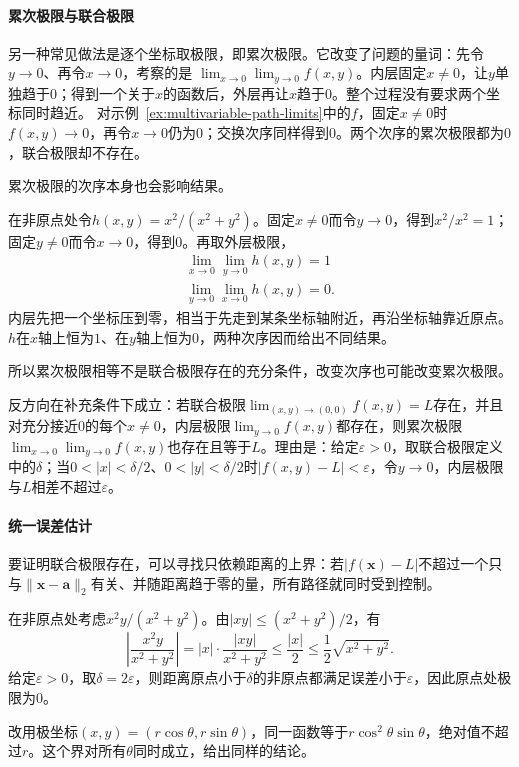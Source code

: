 \paragraph{累次极限与联合极限}
另一种常见做法是逐个坐标取极限，即累次极限。它改变了问题的量词：先令$y\to0$、再令$x\to0$，考察的是
$\lim_{x\to0}\lim_{y\to0}f(x,y)$。内层固定$x\neq0$，让$y$单独趋于$0$；得到一个关于$x$的函数后，外层再让$x$趋于$0$。整个过程没有要求两个坐标同时趋近。
对示例~\ref{ex:multivariable-path-limits}中的$f$，固定$x\neq0$时$f(x,y)\to0$，再令$x\to0$仍为$0$；交换次序同样得到$0$。两个次序的累次极限都为$0$，联合极限却不存在。

累次极限的次序本身也会影响结果。
\begin{example}[两个次序的累次极限不相等]
\label{ex:multivariable-iterated-limits-differ}
在非原点处令$h(x,y)=x^2/(x^2+y^2)$。固定$x\neq0$而令$y\to0$，得到$x^2/x^2=1$；固定$y\neq0$而令$x\to0$，得到$0$。再取外层极限，
\[
 \begin{gathered}
\lim_{x\to0}\lim_{y\to0}h(x,y)=1\\
\lim_{y\to0}\lim_{x\to0}h(x,y)=0.
 \end{gathered}
\]
内层先把一个坐标压到零，相当于先走到某条坐标轴附近，再沿坐标轴靠近原点。$h$在$x$轴上恒为$1$、在$y$轴上恒为$0$，两种次序因而给出不同结果。
\end{example}

所以累次极限相等不是联合极限存在的充分条件，改变次序也可能改变累次极限。

反方向在补充条件下成立：若联合极限$\lim_{(x,y)\to(0,0)}f(x,y)=L$存在，并且对充分接近$0$的每个$x\neq0$，内层极限$\lim_{y\to0}f(x,y)$都存在，则累次极限$\lim_{x\to0}\lim_{y\to0}f(x,y)$也存在且等于$L$。理由是：给定$\varepsilon>0$，取联合极限定义中的$\delta$；当$0<|x|<\delta/2$、$0<|y|<\delta/2$时$|f(x,y)-L|<\varepsilon$，令$y\to0$，内层极限与$L$相差不超过$\varepsilon$。

\paragraph{统一误差估计}
要证明联合极限存在，可以寻找只依赖距离的上界：若$|f(\bm x)-L|$不超过一个只与$\lVert\bm x-\bm a\rVert_2$有关、并随距离趋于零的量，所有路径就同时受到控制。
\begin{example}[用距离上界证明联合极限]
\label{ex:multivariable-distance-bound-limit}
在非原点处考虑$x^2y/(x^2+y^2)$。由$|xy|\leq(x^2+y^2)/2$，有
\[
 \left|\frac{x^2y}{x^2+y^2}\right|
 =|x|\cdot\frac{|xy|}{x^2+y^2}
 \leq \frac{|x|}{2}
 \leq\frac12\sqrt{x^2+y^2}.
\]
给定$\varepsilon>0$，取$\delta=2\varepsilon$，则距离原点小于$\delta$的非原点都满足误差小于$\varepsilon$，因此原点处极限为$0$。

改用极坐标$(x,y)=(r\cos\theta,r\sin\theta)$，同一函数等于$r\cos^2\theta\sin\theta$，绝对值不超过$r$。这个界对所有$\theta$同时成立，给出同样的结论。
\end{example}

